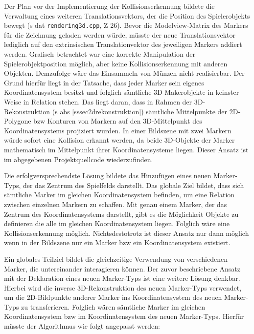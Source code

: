 Der Plan vor der Implementierung der Kollisionserkennung bildete die Verwaltung eines weiteren Translationsvektors, der die Position des Spielerobjekts bewegt (\acs{s} \acs{dat} \texttt{rendering3d.cpp}, \acs{Z} 26). Bevor die Modelview-Matrix des Markers für die Zeichnung geladen werden würde, müsste der neue Translationsvektor lediglich auf den extrinsischen Translationvektor des jeweiligen Markers addiert werden. Grafisch betrachtet war eine korrekte Manipulation der Spielerobjektposition möglich, aber keine Kollisionserkennung mit anderen Objekten. Demzufolge wäre das Einsammeln von Münzen nicht realisierbar. Der Grund hierfür liegt in der Tatsache, dass jeder Marker sein eigenes Koordinatensystem besitzt und folglich sämtliche 3D-Makerobjekte in keinster Weise in Relation stehen. Das liegt daran, dass in Rahmen der 3D-Rekonstruktion (\acs{s} \acs{abs} \ref{sssec2drekonstruktion}) sämtliche Mittelpunkte der 2D-Polygone \acs{bzw} Konturen von Markern auf den 3D-Mittelpunkt des Koordinatensystems projiziert wurden. In einer Bildszene mit zwei Markern würde sofort eine Kollision erkannt werden, da beide 3D-Objekte der Marker mathematisch im Mittelpunkt ihrer Koordinatensysteme liegen. Dieser Ansatz ist im abgegebenen Projektquellcode wiederzufinden.

Die erfolgversprechendste Lösung bildete das Hinzufügen eines neuen Marker-Typs, der das Zentrum des Spielfelds darstellt. Das globale Ziel bildet, dass sich sämtliche Marker im gleichen Koordinatensystem befinden, um eine Relation zwischen einzelnen Markern zu schaffen. Mit genau einem Marker, der das Zentrum des Koordinatensystems darstellt, gibt es die Möglichkeit Objekte zu definieren die alle im gleichen Koordinatensystem liegen. Folglich wäre eine Kollisionserkennung möglich. Nichtsdestotrotz ist dieser Ansatz nur dann möglich wenn in der Bildszene nur ein Marker \acs{bzw} ein Koordinatensystem existiert.

Ein globales Teilziel bildet die gleichzeitige Verwendung von verschiedenen Marker, die untereinander interagieren können. Der zuvor beschriebene Ansatz mit der Deklaration eines neuen Marker-Typs ist eine weitere Lösung denkbar. Hierbei wird die inverse 3D-Rekonstruktion des neuen Marker-Typs verwendet, um die 2D-Bildpunkte anderer Marker ins Koordinatensystem des neuen Marker-Typs zu transferieren. Folglich wären sämtliche Marker im gleichen Koordinatensystem \acs{bzw} im Koordinatensystem des neuen Marker-Typs. Hierfür müsste der Algorithmus wie folgt angepasst werden:

